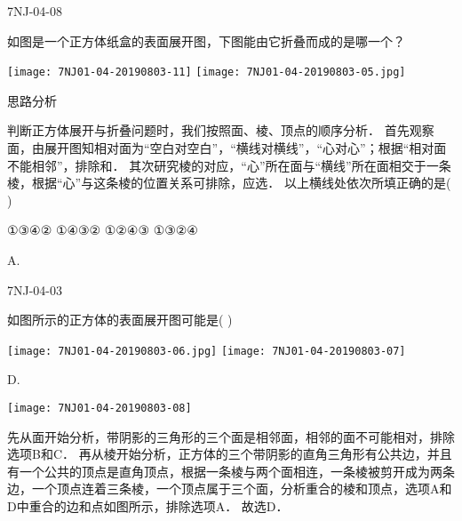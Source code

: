 \begin{defproblem}{7NJ-04-08}%
\begin{onlyproblem}%
如图是一个正方体纸盒的表面展开图，下图能由它折叠而成的是哪一个？ 
\begin{center}
\texttt{[image: 7NJ01-04-20190803-11]}
\texttt{[image: 7NJ01-04-20190803-05.jpg]}
\end{center}
思路分析 

判断正方体展开与折叠问题时，我们按照面、棱、顶点的顺序分析． 首先观察面，由展开图知相对面为“空白对空白”，“横线对横线”，“心对心”；根据“相对面不能相邻”，排除\underline{\hspace*{2cm}}和\underline{\hspace*{2cm}}． 其次研究棱的对应，“心”所在面与“横线”所在面相交于一条棱，根据“心”与这条棱的位置关系可排除\underline{\hspace*{2cm}}，应选\underline{\hspace*{2cm}}． 以上横线处依次所填正确的是(    ) 

\xx
{①③④②}
{①④③②}
{①②④③}
{①③②④}
\end{onlyproblem}%
\begin{onlysolution}%
\begin{solution}%
A.

\end{solution}%
\end{onlysolution}%
\end{defproblem}




\begin{defproblem}{7NJ-04-03}%
\begin{onlyproblem}%
如图所示的正方体的表面展开图可能是(    ) 
\begin{center}
\texttt{[image: 7NJ01-04-20190803-06.jpg]}
\texttt{[image: 7NJ01-04-20190803-07]}
\end{center}


\end{onlyproblem}%
\begin{onlysolution}%
\begin{solution}%
D.
\begin{center}
\texttt{[image: 7NJ01-04-20190803-08]}
\end{center}
先从面开始分析，带阴影的三角形的三个面是相邻面，相邻的面不可能相对，排除选项B和C． 再从棱开始分析，正方体的三个带阴影的直角三角形有公共边，并且有一个公共的顶点是直角顶点，根据一条棱与两个面相连，一条棱被剪开成为两条边，一个顶点连着三条棱，一个顶点属于三个面，分析重合的棱和顶点，选项A和D中重合的边和点如图所示，排除选项A．    故选D． 
\end{solution}%
\end{onlysolution}%
\end{defproblem}




